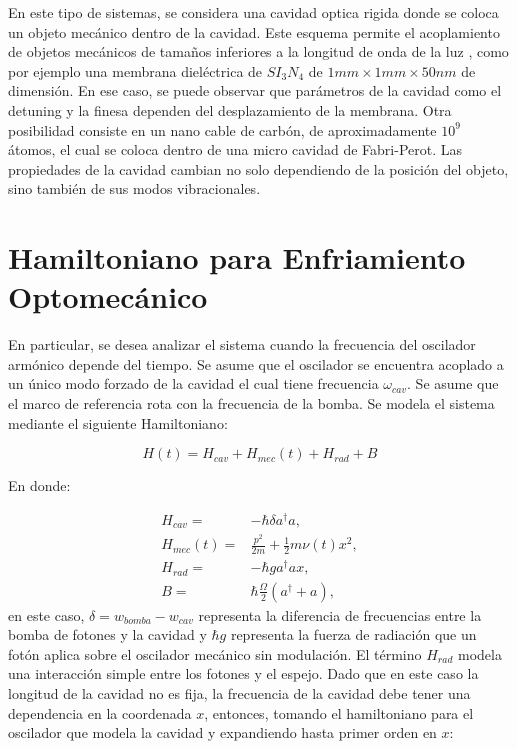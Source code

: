\documentclass[a4paper,10pt]{report}
\begin{document}
En este tipo de sistemas, se considera una cavidad optica rigida donde se coloca un objeto mecánico dentro de la cavidad. Este esquema permite el acoplamiento de objetos mecánicos de tamaños inferiores a la longitud de onda de la luz \cite{KippenberCO}, como por ejemplo una membrana dieléctrica de $SI_3N_4$ de  $1mm \times 1mm \times 50nm$
de dimensión\cite{SankeyMC}. En ese caso, se puede observar que parámetros de la cavidad como el detuning y la finesa dependen del desplazamiento de la membrana. Otra posibilidad consiste en un nano cable de carbón, de aproximadamente $10^9$ átomos, el cual se coloca dentro de una micro cavidad de Fabri-Perot. Las propiedades de la cavidad cambian no solo dependiendo de la posición del objeto, sino también de sus modos vibracionales\cite{FaveroCR}.  

\section{Hamiltoniano para Enfriamiento Optomecánico}

En particular, se desea analizar el sistema cuando la frecuencia del oscilador armónico depende del tiempo. Se asume que el oscilador se encuentra acoplado a un único modo forzado de la cavidad el cual tiene frecuencia $\omega_{cav}$. Se asume que el marco de referencia rota con la frecuencia de la bomba. Se modela el sistema mediante el siguiente Hamiltoniano\cite{BarberisLC}:

\begin{equation}
H(t) = H_{cav} + H_{mec}(t) + H_{rad} + B
\end{equation}

En donde:

\begin{align}
H_{cav} =& -\hbar \delta a^\dagger a,\\
H_{mec}(t) =& \frac{p^2}{2m} + \frac{1}{2}m \nu (t) x^2,\\
H_{rad} =& -\hbar g a^\dagger a x,\\
B =& \hbar\frac{\Omega}{2}(a^\dagger + a),
\end{align} en este caso, $\delta = w_{bomba} - w_{cav}$ representa la diferencia de frecuencias entre la bomba de fotones y la cavidad y $\hbar g$ representa la fuerza de radiación que un fotón aplica sobre el oscilador mecánico sin modulación. El término $H_{rad}$ modela una interacción simple entre los fotones y el espejo. Dado que en este caso la longitud de la cavidad no es fija, la frecuencia de la cavidad debe tener una dependencia en la coordenada $x$, entonces, tomando el hamiltoniano para el oscilador que modela la cavidad y expandiendo hasta primer orden en $x$\cite{KippenberCO}:
\end{document}
